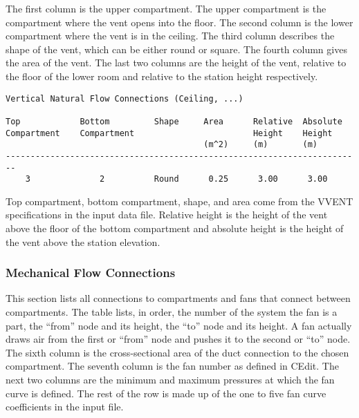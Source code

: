 The first column is the upper compartment.  The upper compartment is the compartment where the vent opens into the floor.  The second column is the lower compartment where the vent is in the ceiling.  The third column describes the shape of the vent, which can be either round or square.  The fourth column gives the area of the vent.  The last two columns are the height of the vent, relative to the floor of the lower room and relative to the station height respectively.
\begin{lstlisting}[basicstyle=\tiny]
Vertical Natural Flow Connections (Ceiling, ...)

Top            Bottom         Shape     Area      Relative  Absolute
Compartment    Compartment                        Height    Height
                                        (m^2)     (m)       (m)
------------------------------------------------------------------------
    3              2          Round      0.25      3.00      3.00
\end{lstlisting}
Top compartment, bottom compartment, shape, and area come from the VVENT specifications in the input data file. Relative height is the height of the vent above the floor of the bottom compartment and absolute height is the height of the vent above the station elevation.

\subsubsection{Mechanical Flow Connections}

This section lists all connections to compartments and fans that connect between compartments. The table lists, in order, the number of the system the fan is a part, the ``from'' node and its height, the ``to'' node and its height.  A fan actually draws air from the first or ``from'' node and pushes it to the second or ``to'' node. The sixth column is the cross-sectional area of the duct connection to the chosen compartment. The seventh column is the fan number as defined in CEdit.  The next two columns are the minimum and maximum pressures at which the fan curve is defined.  The rest of the row is made up of the one to five fan curve coefficients in the input file.

